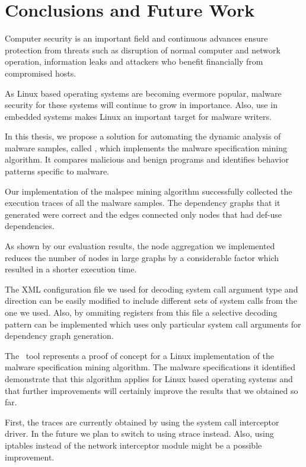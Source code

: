 \chapter{Conclusions and Future Work}
\label{chapter:sixth}

Computer security is an important field and continuous advances ensure protection from threats such as disruption of normal computer and network operation, information leaks and attackers who benefit financially from compromised hosts.

As Linux based operating systems are becoming evermore popular, malware security for these systems will continue to grow in importance. Also, use in embedded systems makes Linux an important target for malware writers.

In this thesis, we propose a solution for automating the dynamic analysis of malware samples, called \project, which implements the malware specification mining algorithm. It compares malicious and benign programs and identifies behavior patterns specific to malware.

Our implementation of the malspec mining algorithm successfully collected the execution traces of all the malware samples. The dependency graphs that it generated were correct and the edges connected only nodes that had def-use dependencies.

As shown by our evaluation results, the node aggregation we implemented reduces the number of nodes in large graphs by a considerable factor which resulted in a shorter execution time.

The XML configuration file we used for decoding system call argument type and direction can be easily modified to include different sets of system calls from the one we used. Also, by ommiting registers from this file a selective decoding pattern can be implemented which uses only particular system call arguments for dependency graph generation.

The \textbf{\project}\ tool represents a proof of concept for a Linux implementation of the malware specification mining algorithm. The malware specifications it identified demonstrate that this algorithm applies for Linux based operating systems and that further improvements will certainly improve the results that we obtained so far.

First, the traces are currently obtained by using the system call interceptor driver. In the future we plan to switch to using strace instead. Also, using iptables instead of the network interceptor module might be a possible improvement.

